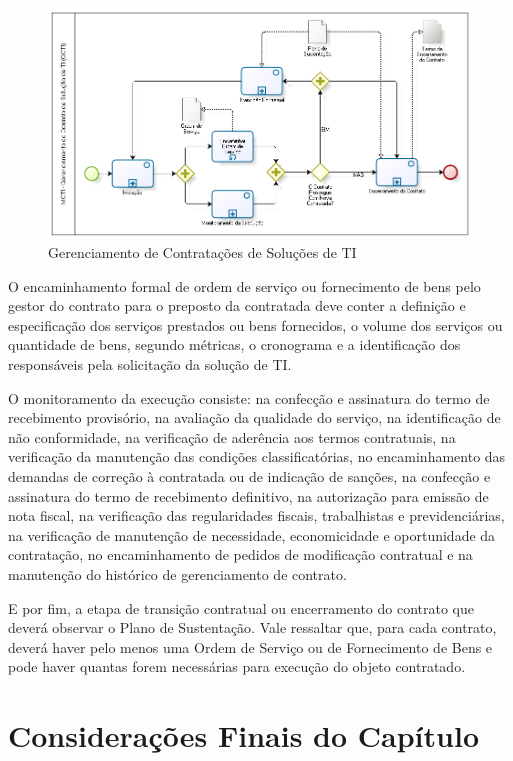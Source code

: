\begin{figure}[H]
		\centering
		\label{fig05}
			\includegraphics[scale=0.6]{figuras/GCTI.png}
		\caption{Gerenciamento de Contratações de Soluções de TI   \cite{mcti}}
\label{gcti}
\end{figure}



O encaminhamento formal de ordem de serviço ou fornecimento de bens pelo gestor do contrato para o preposto da contratada deve conter a definição e especificação dos serviços prestados ou bens fornecidos, o volume dos serviços ou quantidade de bens, segundo métricas, o cronograma e a identificação dos responsáveis pela solicitação da solução de TI. 

O monitoramento da execução consiste: na confecção e assinatura do termo de recebimento provisório, na avaliação da qualidade do serviço, na identificação de não conformidade, na verificação de aderência aos termos contratuais, na verificação da manutenção das condições classificatórias, no encaminhamento das demandas de correção à contratada ou de indicação de sanções, na confecção e assinatura do termo de recebimento definitivo, na autorização para emissão de nota fiscal, na verificação das regularidades fiscais, trabalhistas e previdenciárias, na verificação de manutenção de necessidade, economicidade e oportunidade da contratação, no encaminhamento de pedidos de modificação contratual e na manutenção do histórico de gerenciamento de contrato. 

E por fim, a etapa de transição contratual ou encerramento do contrato que deverá observar o Plano de Sustentação. Vale ressaltar que, para cada contrato, deverá haver pelo menos uma Ordem de Serviço ou de Fornecimento de Bens e pode haver quantas forem necessárias para execução do objeto contratado.

\section[Considerações Finais do Capítulo]{Considerações Finais do Capítulo}

